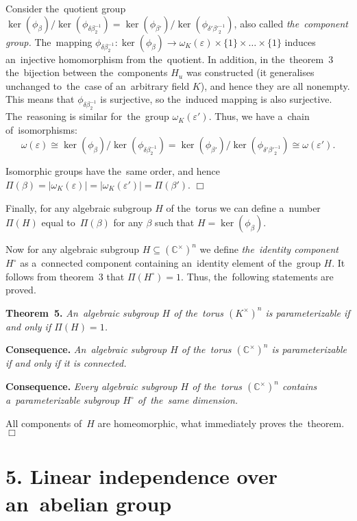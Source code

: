 \documentclass[twoside]{article}
\begin{document}
    Consider the~quotient group $\ker(\phi_\beta) / \ker(\phi_{\delta \beta_2^{-1}}) = \ker(\phi_{\beta'}) / \ker(\phi_{\delta' {\beta'}_2^{-1}})$,
    also called \textit{the~component group.} The~mapping $\phi_{\delta \beta_2^{-1}} : \ker(\phi_\beta) \rightarrow \omega_K(\varepsilon) \times \{ 1 \} \times \ldots \times \{ 1 \}$
    induces an~injective homomorphism from the~quotient. In addition, in the~theorem~3 the~bijection between the~components $H_u$
    was constructed (it generalises unchanged to~the~case of an~arbitrary field $K$), and hence they are all nonempty.
    This means that $\phi_{\delta \beta_2^{-1}}$ is surjective, so the~induced mapping is also surjective.
    The~reasoning is similar for~the~group $\omega_K(\varepsilon')$. Thus, we have a~chain of~isomorphisms:
    $$
        \omega(\varepsilon) \cong \ker(\phi_\beta) / \ker(\phi_{\delta \beta_2^{-1}}) = \ker(\phi_{\beta'}) / \ker(\phi_{\delta' {\beta'}_2^{-1}}) \cong \omega(\varepsilon').
    $$

    Isomorphic groups have the~same order, and hence $\Pi(\beta) = |\omega_K(\varepsilon)| = |\omega_K(\varepsilon')| = \Pi(\beta')$.
\hfill$\Box$\medskip

Finally, for any algebraic subgroup $H$ of the~torus we can define a~number $\Pi(H)$ equal to~$\Pi(\beta)$
for any $\beta$ such that $H = \ker(\phi_\beta)$.

Now for any algebraic subgroup $H \subseteq (\mathbb{C}^\times)^n$ we define \textit{the~identity component} $H^\circ$
as a~connected component containing an~identity element of the~group $H$. It follows from theorem~3
that $\Pi(H^\circ) = 1$. Thus, the~following statements are proved.

\medskip\noindent\textbf{Theorem~5.}\emph{
    An~algebraic subgroup $H$ of the~torus $(K^\times)^n$ is parameterizable if and only if $\Pi(H) = 1$.
}

\medskip\noindent\textbf{Consequence.}\emph{
    An~algebraic subgroup $H$ of the~torus $(\mathbb{C}^\times)^n$ is parameterizable if and only if it is connected.
}

\medskip\noindent\textbf{Consequence.}\emph{
    Every algebraic subgroup $H$ of the~torus $(\mathbb{C}^\times)^n$ contains a~parameterizable subgroup $H^\circ$ of~the~same dimension.
}\medskip

    All components of~$H$ are homeomorphic, what immediately proves the~theorem.
\hfill$\Box$\medskip

\section*{5. Linear independence over an~abelian group}
\end{document}

